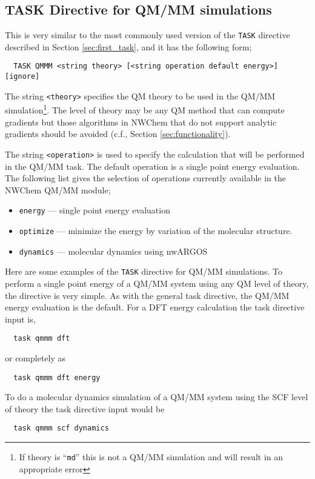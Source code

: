 \subsection{TASK Directive for QM/MM simulations}

This is very similar to the most commonly used version of the
\verb+TASK+ directive described in Section \ref{sec:first_task}, and
it has the following form;

\begin{verbatim}
  TASK QMMM <string theory> [<string operation default energy>] [ignore]
\end{verbatim}

The string \verb+<theory>+ specifies the QM theory to be used in the
QM/MM simulation\footnote{If theory is ``{\tt md}'' this is not a QM/MM
simulation and will result in an appropriate error}.  The level of
theory may be any QM method that can compute gradients but those
algorithms in NWChem that do not support analytic gradients should be
avoided (c.f., Section \ref{sec:functionality}).  

The string \verb+<operation>+ is used to specify the calculation that will
be performed in the QM/MM task.  The default operation is a single point energy
evaluation.  The following list gives the selection of operations currently
available in the NWChem QM/MM module;
\begin{itemize}
\item \verb+energy+ --- single point energy evaluation
\item \verb+optimize+ --- minimize the energy by variation of the molecular
   structure.  
\item \verb+dynamics+ --- molecular dynamics using nwARGOS
\end{itemize}

Here are some examples of the \verb+TASK+ directive for QM/MM
simulations.  To perform a single point energy of a QM/MM system using
any QM level of theory, the directive is very simple. As with the
general task directive, the QM/MM energy evaluation is the
default. For a DFT energy calculation the task directive input is,
\begin{verbatim}
  task qmmm dft
\end{verbatim}
or completely as
\begin{verbatim}
  task qmmm dft energy
\end{verbatim}

To do a molecular dynamics simulation of a QM/MM system using the SCF
level of theory the task directive input would be
\begin{verbatim}
  task qmmm scf dynamics
\end{verbatim}

